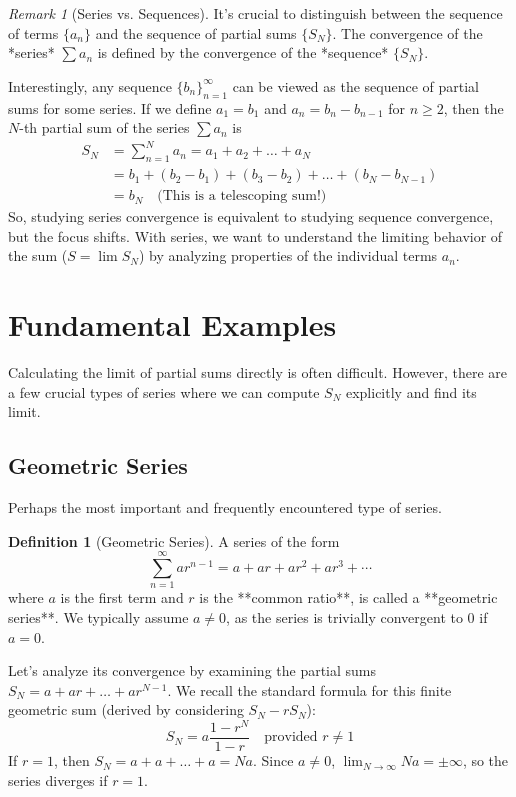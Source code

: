 \documentclass[11pt, letterpaper]{article}
\theoremstyle{plain} %
\theoremstyle{definition} %
\newtheorem{definition}[theorem]{Definition} %
\theoremstyle{remark} %
\newtheorem{remark}[theorem]{Remark} %
\begin{document}
\begin{remark}[Series vs. Sequences]
It's crucial to distinguish between the sequence of terms $\{a_n\}$ and the sequence of partial sums $\{S_N\}$. The convergence of the *series* $\sum a_n$ is defined by the convergence of the *sequence* $\{S_N\}$.

Interestingly, any sequence $\{b_n\}_{n=1}^\infty$ can be viewed as the sequence of partial sums for some series. If we define $a_1 = b_1$ and $a_n = b_n - b_{n-1}$ for $n \ge 2$, then the $N$-th partial sum of the series $\sum a_n$ is
\begin{align*} S_N &= \sum_{n=1}^N a_n = a_1 + a_2 + \dots + a_N \\ &= b_1 + (b_2 - b_1) + (b_3 - b_2) + \dots + (b_N - b_{N-1}) \\ &= b_N \quad \text{(This is a telescoping sum!)} \end{align*}
So, studying series convergence is equivalent to studying sequence convergence, but the focus shifts. With series, we want to understand the limiting behavior of the sum ($S = \lim S_N$) by analyzing properties of the individual terms $a_n$.
\end{remark}

\section{Fundamental Examples}

Calculating the limit of partial sums directly is often difficult. However, there are a few crucial types of series where we can compute $S_N$ explicitly and find its limit.

\subsection{Geometric Series}

Perhaps the most important and frequently encountered type of series.

\begin{definition}[Geometric Series]
A series of the form
\[ \sum_{n=1}^{\infty} a r^{n-1} = a + ar + ar^2 + ar^3 + \dotsb \]
where $a$ is the first term and $r$ is the **common ratio**, is called a **geometric series**. We typically assume $a \neq 0$, as the series is trivially convergent to 0 if $a=0$.
\end{definition}

Let's analyze its convergence by examining the partial sums $S_N = a + ar + \dots + ar^{N-1}$. We recall the standard formula for this finite geometric sum (derived by considering $S_N - rS_N$):
\[ S_N = a \frac{1 - r^N}{1 - r} \quad \text{provided } r \neq 1 \]
If $r=1$, then $S_N = a + a + \dots + a = Na$. Since $a \neq 0$, $\lim_{N \to \infty} Na = \pm \infty$, so the series diverges if $r=1$.
\end{document}
